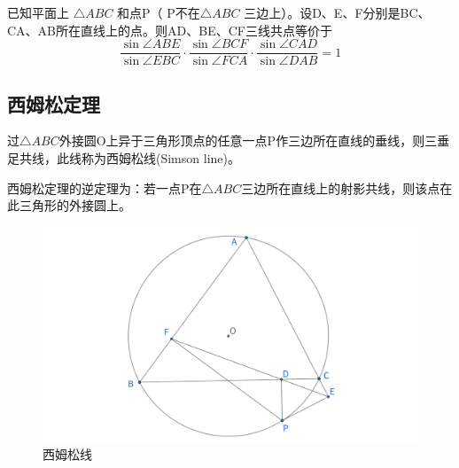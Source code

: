 \begin{theorem}[角元形式赛瓦定理]
    已知平面上 $\triangle A B C$ 和点P（ P不在$\triangle A B C$ 三边上）。设D、E、F分别是BC、CA、AB所在直线上的点。则AD、BE、CF三线共点等价于
    $$
    \frac{\sin \angle ABE}{\sin \angle EBC}
    \cdot 
    \frac{\sin \angle BCF}{\sin \angle FCA}
    \cdot 
    \frac{\sin \angle CAD}{\sin \angle DAB}
    =1
    $$
\end{theorem}


\newpage 
\subsection{西姆松定理}
\begin{theorem}
过$\triangle ABC$外接圆O上异于三角形顶点的任意一点P作三边所在直线的垂线，则三垂足共线，此线称为西姆松线(Simson line)。

西姆松定理的逆定理为：若一点P在$\triangle ABC$三边所在直线上的射影共线，则该点在此三角形的外接圆上。
\end{theorem}

\begin{figure}[htbp]
    \centering
    \includegraphics[width=\linewidth]{figures/西姆松线.png}
    \caption{西姆松线}
\end{figure}


\newpage
